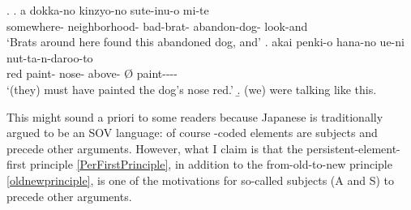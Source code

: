 %
\ex.
 \ag. a dokka-no kinzyo-no  sute-inu-o mi-te \\
		 somewhere- neighborhood- bad-brat- abandon-dog- look-and \\
		`Brats around here found this abandoned dog, and'
 \bg. akai penki-o hana-no ue-ni \EM{\O} nut-ta-n-daroo-to \\
 	red paint- nose- above- {\O} paint---- \\
	`(they) must have painted the dog's nose red.'
 \b. (we) were talking like this.

This might sound a priori to some readers because Japanese is traditionally argued to be an SOV language:
of course -coded elements are subjects and precede other arguments.
However, what I claim is that
the persistent-element-first principle \ref{PerFirstPrinciple}, in addition to the from-old-to-new principle \ref{oldnewprinciple}, is one of the motivations for so-called subjects (A and S) to precede other arguments.
%

